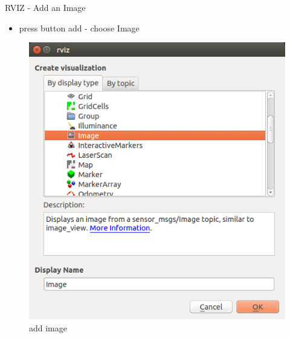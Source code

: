 \documentclass{beamer}
\begin{document}
\begin{frame}{RVIZ - Add an Image}	

	\begin{itemize}
		\item press button add - choose Image
			
	\end{itemize}

	\begin{figure}[H]
		\centering
		\includegraphics[scale=0.3]{./images/Add_Image.png}
		\caption{add image }
		\label{fig:ros_add_image}
	\end{figure}

\end{frame}
\end{document}
